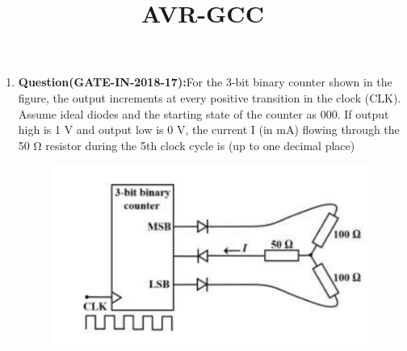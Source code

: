 \documentclass[12pt]{article}
\begin{document}
\title{\textbf{AVR-GCC}}
\date{}
\maketitle
\begin{enumerate}
    \item \textbf{Question(GATE-IN-2018-17):}For the 3-bit binary counter shown in the figure, the output increments at every positive 
transition in the clock (CLK). Assume ideal diodes and the starting state of the counter as 
000. If output high is 1 V and output low is 0 V, the current I (in mA) flowing through the 
50 Ω resistor during the 5th clock cycle is (up to one decimal place)

 \begin{figure}[H]
\centering
\includegraphics[width=\columnwidth]{figs/2018-gate-in-17.png}
\caption{}
\label{fig:2018-gate-in-17}
\end{figure}

   


\end{enumerate}
\end{document}
